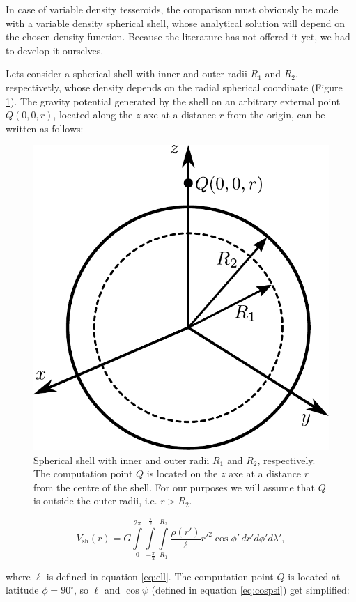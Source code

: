 \documentclass[extra]{gji}
\begin{document}
In case of variable density tesseroids, the comparison must obviously be made with a variable density spherical shell, whose analytical solution will depend on the chosen density function.
Because the literature has not offered it yet, we had to develop it ourselves. 

Lets consider a spherical shell with inner and outer radii $R_1$ and $R_2$, respectivetly, whose density depends on the radial spherical coordinate (Figure \ref{fig:spherical-shell}).
The gravity potential generated by the shell on an arbitrary external point $Q(0,0,r)$, located along the $z$ axe at a distance $r$ from the origin, can be written as follows:

\begin{figure}
\centering
\includegraphics[width=0.7\linewidth]{figures/spherical-shell.pdf}
\caption{
Spherical shell with inner and outer radii $R_1$ and $R_2$, respectively.
The computation point $Q$ is located on the $z$ axe at a distance $r$ from the centre of the shell.
For our purposes we will assume that $Q$ is outside the outer radii, i.e. $r > R_2$.
}
\label{fig:spherical-shell}
\end{figure}

\begin{equation}
    V_\text{sh}(r) = G 
    \int\limits_0^{2\pi}
    \int\limits_{-\frac{\pi}{2}}^\frac{\pi}{2}
    \int\limits_{R_1}^{R_2}
    \frac{\rho(r')}{\ell} {r'}^2 \cos\phi' \, 
    dr' d\phi' d\lambda',
\end{equation}

\noindent where $\ell$ is defined in equation \ref{eq:ell}.
The computation point $Q$ is located at latitude $\phi=90^\circ$, so $\ell$ and $\cos\psi$ (defined in equation \ref{eq:cospsi}) get simplified:
\end{document}
